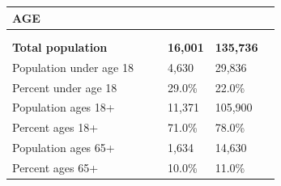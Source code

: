 \documentclass[9pt]{report}
\begin{document}
\vspace{24pt}
\setlength{\tabcolsep}{.01in} %
\begin{tabular}{p{.10in}p{.10in}p{.10in}p{3.7in}>{\hfill}p{.85in}>{\hfill}p{.85in}>{\hfill}p{.85in}>{\hfill}p{.85in}p{0.1in}}
\multicolumn{9}{l}{\parbox{7.1in}{\raggedright{\large{\strut\textbf{AGE}\strut}}}} \\ 
\hline
\multicolumn{4}{l}{\parbox{3.5in}{\raggedright{\textbf{}}}} & \multicolumn{1}{r}{\parbox{.85in}{\strut\raggedleft{\textbf{}\strut}}} & \multicolumn{1}{r}{\parbox{.85in}{\strut\raggedleft{\textbf{}\strut}}} & \multicolumn{1}{r}{\parbox{.85in}{\strut{}}} & \multicolumn{1}{r}{\parbox{.85in}{\strut{}}} & \\ 
\multicolumn{9}{l}{} \\ 
\multicolumn{4}{l}{\parbox{3.5in}{\strut\raggedright{\textbf{Total population}\strut}}} & \textbf{} & \textbf{} & \textbf{16,001} & \textbf{135,736} & \textbf{} \\ 
\multicolumn{4}{l}{\parbox{3.6in}{\strut\raggedright{{Population under age 18}}\strut}} &  &  & 4,630 & 29,836 & \multicolumn{1}{l}{}  \\ 
\multicolumn{4}{l}{\parbox{3.6in}{\strut\raggedright{{Percent under age 18}}\strut}} &  &  & 29.0\% & 22.0\% & \multicolumn{1}{l}{}  \\ 
\multicolumn{4}{l}{\parbox{3.6in}{\strut\raggedright{{Population ages 18+}}\strut}} &  &  & 11,371 & 105,900 & \multicolumn{1}{l}{}  \\ 
\multicolumn{4}{l}{\parbox{3.6in}{\strut\raggedright{{Percent ages 18+}}\strut}} &  &  & 71.0\% & 78.0\% & \multicolumn{1}{l}{}  \\ 
\multicolumn{4}{l}{\parbox{3.6in}{\strut\raggedright{{Population ages 65+}}\strut}} &  &  & 1,634 & 14,630 & \multicolumn{1}{l}{}  \\ 
\multicolumn{4}{l}{\parbox{3.6in}{\strut\raggedright{{Percent ages 65+}}\strut}} &  &  & 10.0\% & 11.0\% & \multicolumn{1}{l}{}  \\ 

\end{tabular}
\setlength{\tabcolsep}{6pt} %
\end{document}
